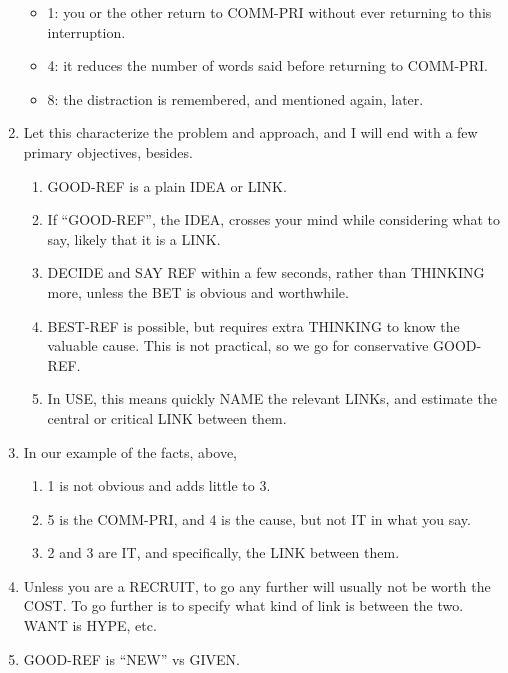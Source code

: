 \documentclass[
]{book}
\providecommand{\tightlist}{%
  \setlength{\itemsep}{0pt}\setlength{\parskip}{0pt}}
\begin{document}
\begin{enumerate}
  \begin{itemize}
  \tightlist
  \item
    1: you or the other return to COMM-PRI without ever returning to
    this interruption.
  \item
    4: it reduces the number of words said before returning to
    COMM-PRI.
  \item
    8: the distraction is remembered, and mentioned again, later.
  \end{itemize}
\item
  Let this characterize the problem and approach, and I will end with
  a few primary objectives, besides.

  \begin{enumerate}
  \def\labelenumii{\arabic{enumii}.}
  \tightlist
  \item
    GOOD-REF is a plain IDEA or LINK.
  \item
    If ``GOOD-REF'', the IDEA, crosses your mind while considering
    what to say, likely that it is a LINK.
  \item
    DECIDE and SAY REF within a few seconds, rather than THINKING
    more, unless the BET is obvious and worthwhile.
  \item
    BEST-REF is possible, but requires extra THINKING to know the
    valuable cause. This is not practical, so we go for conservative
    GOOD-REF.
  \item
    In USE, this means quickly NAME the relevant LINKs, and estimate
    the central or critical LINK between them.
  \end{enumerate}
\item
  In our example of the facts, above,

  \begin{enumerate}
  \def\labelenumii{\arabic{enumii}.}
  \tightlist
  \item
    1 is not obvious and adds little to 3.
  \item
    5 is the COMM-PRI, and 4 is the cause, but not IT in what you
    say.
  \item
    2 and 3 are IT, and specifically, the LINK between them.
  \end{enumerate}
\item
  Unless you are a RECRUIT, to go any further will usually not be
  worth the COST. To go further is to specify what kind of link is
  between the two. WANT is HYPE, etc.
\item
  GOOD-REF is ``NEW'' vs GIVEN.
\end{enumerate}
\end{document}
